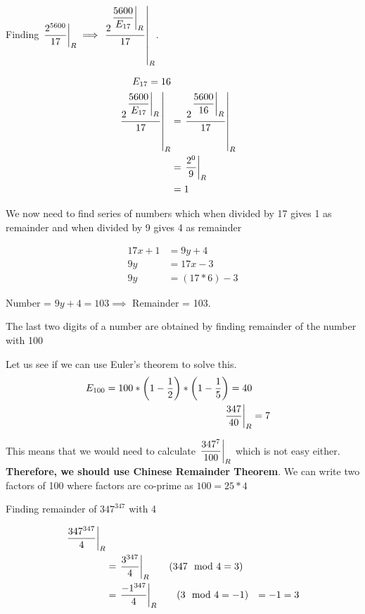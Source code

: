 Finding $\displaystyle{ \left. \frac{2^{5600}}{17} \right |_{R} } \implies \displaystyle{ \left. \frac{2^{ \displaystyle{ \left. \frac{5600}{E_{17}} \right |_{R} } }}{17} \right |_{R} }$. 

\begin{align*}
    E_{17} = 16 \\
    \displaystyle{ \left. \frac{2^{ \displaystyle{ \left. \frac{5600}{E_{17}} \right |_{R} } }}{17} \right |_{R} } &= \displaystyle{ \left. \frac{2^{ \displaystyle{ \left. \frac{5600}{16} \right |_{R} } }}{ 17 } \right |_{R} } \\
    &= \displaystyle{ \left. \frac{2^{0}}{ 9} \right |_{R} } \\
    &= 1
\end{align*}

We now need to find series of numbers which when divided by 17 gives 1 as remainder and when divided by 9 gives 4 as remainder

\begin{align*}
    17x + 1 &= 9y + 4 \\
    9y &= 17x - 3 \\
    9y &= (17*6) - 3 \tag{$x=6 \implies y=11$} 
\end{align*}

Number = $9y + 4 = 103 \implies$ Remainder = 103. 


\begin{EXTRA-LEARNING}
    The last two digits of a number are obtained by finding remainder of the number with 100
\end{EXTRA-LEARNING}

Let us see if we can use Euler's theorem to solve this.
\begin{align*}
    E_{100} = 100 * \left ( 1 - \dfrac{1}{2} \right ) * \left ( 1 - \dfrac{1}{5} \right ) = 40 \\
    \displaystyle{ \left. \frac{347}{40} \right |_{R} } &= 7
\end{align*}

This means that we would need to calculate $\displaystyle{ \left. \frac{347^7}{100} \right |_{R} }$ which is not easy either. \textbf{Therefore, we should use Chinese Remainder Theorem}. We can write two factors of 100 where factors are co-prime as $100 = 25 * 4$

Finding remainder of $347^{347}$ with 4

\begin{align*}
    \displaystyle{ \left. \frac{347^{347}}{4} \right |_{R} } \\
    &= \displaystyle{ \left. \frac{3^{347}}{4} \right |_{R} } \tag{$347 \mod 4 = 3$} \\
    &= \displaystyle{ \left. \frac{-1^{347}}{4} \right |_{R} } \tag{$3 \mod 4 = -1$}
    &= -1 = 3
\end{align*}

